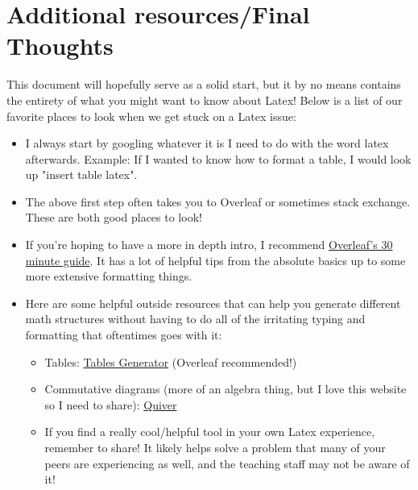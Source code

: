 \documentclass[11 pt]{article}
\begin{document}
\pagebreak

\section{Additional resources/Final Thoughts}
This document will hopefully serve as a solid start, but it by no means contains the entirety of what you might want to know about Latex! Below is a list of our favorite places to look when we get stuck on a Latex issue:
\begin{itemize}
    \item I always start by googling whatever it is I need to do with the word latex afterwards. Example: If I wanted to know how to format a table, I would look up "insert table latex". 
    \item The above first step often takes you to Overleaf or sometimes stack exchange. These are both good places to look!
    \item If you're hoping to have a more in depth intro, I recommend \href{https://www.overleaf.com/learn/latex/Learn_LaTeX_in_30_minutes}{Overleaf's 30 minute guide}. It has a lot of helpful tips from the absolute basics up to some more extensive formatting things. 
    \item Here are some helpful outside resources that can help you generate different math structures without having to do all of the irritating typing and formatting that oftentimes goes with it:
    \begin{itemize}
        \item Tables: \href{https://www.tablesgenerator.com/}{Tables Generator} (Overleaf recommended!) 
        \item Commutative diagrams (more of an algebra thing, but I love this website so I need to share): \href{https://q.uiver.app/}{Quiver}
        \item If you find a really cool/helpful tool in your own Latex experience, remember to share! It likely helps solve a problem that many of your peers are experiencing as well, and the teaching staff may not be aware of it!
    \end{itemize} %
\end{itemize}
\end{document}
